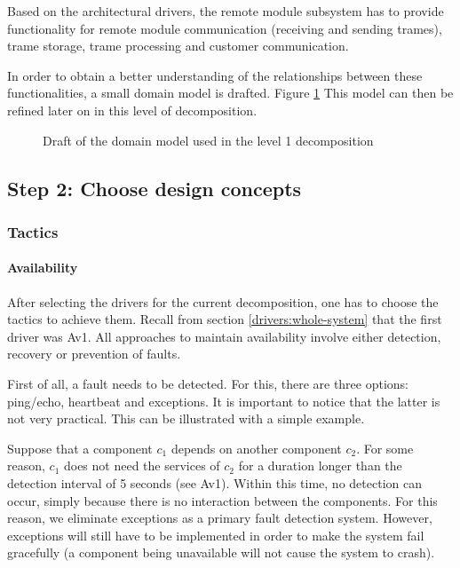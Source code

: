 \npar Based on the architectural drivers, the remote module subsystem has to
provide functionality for remote module communication (receiving and sending
trames), trame storage, trame processing and customer communication. 

\npar In order to obtain a better understanding of the relationships between
these functionalities, a small domain model is drafted. Figure
\ref{fig:add/it1/draft} This model can then be refined later on
in this level of decomposition.

\begin{figure}[H]
	\begin{centering}
		\caption{Draft of the domain model used in the level 1 decomposition}
		\label{fig:add/it1/draft}
	\end{centering}
\end{figure}

\subsection{Step 2: Choose design concepts}
\label{add:it1/concepts}

\subsubsection{Tactics}
\label{add:it1/tactics}

\paragraph{Availability} %

\npar After selecting the drivers for the current decomposition, one has to
choose the tactics to achieve them. Recall from section
\ref{drivers:whole-system} that the first driver was Av1. All approaches to
maintain availability involve either detection, recovery or prevention of
faults.

\npar First of all, a fault needs to be detected. For this, there are three
options: ping/echo, heartbeat and exceptions. It is important to notice that the
latter is not very practical. This can be illustrated with a simple example.

\npar Suppose that a component $c_1$ depends on another component $c_2$. For
some reason, $c_1$ does not need the services of $c_2$ for a duration longer
than the detection interval of 5 seconds (see Av1). Within this time, no
detection can occur, simply because there is no interaction between the
components. For this reason, we eliminate exceptions as a primary fault
detection system. However, exceptions will still have to be implemented in order
to make the system fail gracefully (a component being unavailable will not
cause the system to crash).

